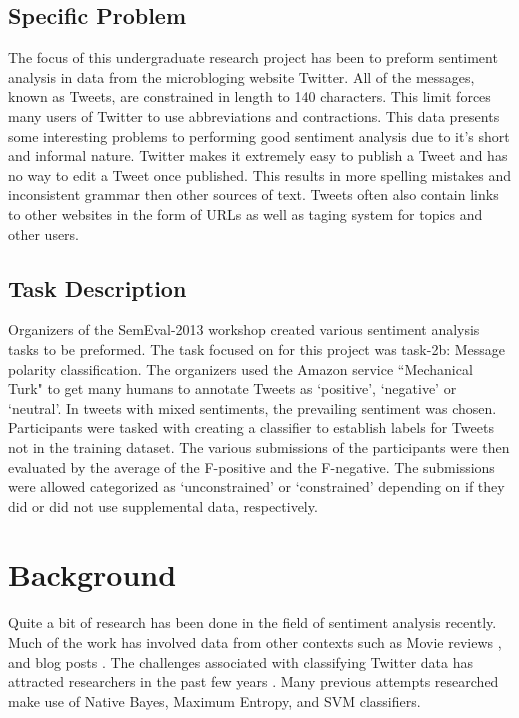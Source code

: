 \documentclass[final,3p,12pt]{elsarticle}
\begin{document}
\subsection{Specific Problem}

The focus of this undergraduate research project has been to preform sentiment
analysis in data from the microbloging website Twitter. All of the messages,
known as Tweets, are constrained in length to 140 characters. This limit forces
many users of Twitter to use abbreviations and contractions. This data presents
some interesting problems to performing good sentiment analysis due to it's
short and informal nature. Twitter makes it extremely easy to publish a Tweet
and has no way to edit a Tweet once published. This results in more spelling
mistakes and inconsistent grammar then other sources of text. Tweets often also
contain links to other websites in the form of URLs as well as taging system
for topics and other users.

\subsection{Task Description}

Organizers of the SemEval-2013 workshop created various sentiment analysis
tasks to be preformed. The task focused on for this project was task-2b:
Message polarity classification. The organizers used the Amazon service
``Mechanical Turk" to get many humans to annotate Tweets as `positive',
`negative' or `neutral'. In tweets with mixed sentiments, the prevailing
sentiment was chosen. Participants were tasked with creating a classifier to
establish labels for Tweets not in the training dataset. The various
submissions of the participants were then evaluated by the average of the
F-positive and the F-negative. The submissions were allowed categorized as
`unconstrained' or `constrained' depending on if they did or did not use
supplemental data, respectively.


\section{Background}

Quite a bit of research has been done in the field of sentiment analysis
recently. Much of the work has involved data from other contexts such as Movie
reviews \cite{Pang2002}, and blog posts \cite{Melville2009}. The challenges
associated with classifying Twitter data has attracted researchers in the past
few years \cite{Jianfeng2013} \cite{Barbosa2010} \cite{Gokulakrishnan2012}.
Many previous attempts researched make use of Native Bayes, Maximum Entropy,
and SVM classifiers.
\end{document}
